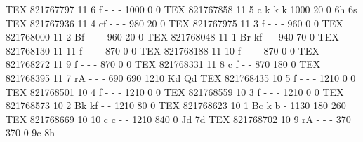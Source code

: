 TEX       821767797 11  6 f   -     -     -         1000    0    0 
TEX       821767858 11  5 c   k     k     k         1000   20    0 6h 6s
TEX       821767936 11  4 cf  -     -     -          980   20    0 
TEX       821767975 11  3 f   -     -     -          960    0    0 
TEX       821768000 11  2 Bf  -     -     -          960   20    0 
TEX       821768048 11  1 Br  kf    -     -          940   70    0 
TEX       821768130 11 11 f   -     -     -          870    0    0 
TEX       821768188 11 10 f   -     -     -          870    0    0 
TEX       821768272 11  9 f   -     -     -          870    0    0 
TEX       821768331 11  8 c   f     -     -          870  180    0 
TEX       821768395 11  7 rA  -     -     -          690  690 1210 Kd Qd
TEX       821768435 10  5 f   -     -     -         1210    0    0 
TEX       821768501 10  4 f   -     -     -         1210    0    0 
TEX       821768559 10  3 f   -     -     -         1210    0    0 
TEX       821768573 10  2 Bk  kf    -     -         1210   80    0 
TEX       821768623 10  1 Bc  k     b     -         1130  180  260 
TEX       821768669 10 10 c   c     -     -         1210  840    0 Jd 7d
TEX       821768702 10  9 rA  -     -     -          370  370    0 9c 8h
